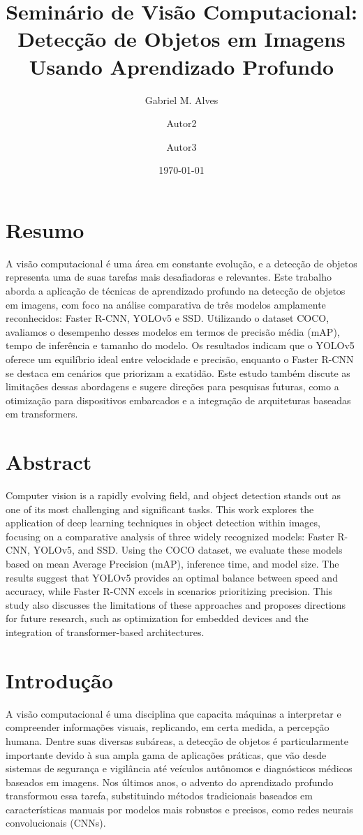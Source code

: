 \documentclass[a4paper,12pt]{article}
\title{Seminário de Visão Computacional: Detecção de Objetos em Imagens Usando Aprendizado Profundo}
\author{Gabriel M. Alves \and Autor2 \and Autor3}
\date{\today}
\begin{document}
	
	\maketitle
	
	\section*{Resumo}
	A visão computacional é uma área em constante evolução, e a detecção de objetos representa uma de suas tarefas mais desafiadoras e relevantes. Este trabalho aborda a aplicação de técnicas de aprendizado profundo na detecção de objetos em imagens, com foco na análise comparativa de três modelos amplamente reconhecidos: Faster R-CNN, YOLOv5 e SSD. Utilizando o dataset COCO, avaliamos o desempenho desses modelos em termos de precisão média (mAP), tempo de inferência e tamanho do modelo. Os resultados indicam que o YOLOv5 oferece um equilíbrio ideal entre velocidade e precisão, enquanto o Faster R-CNN se destaca em cenários que priorizam a exatidão. Este estudo também discute as limitações dessas abordagens e sugere direções para pesquisas futuras, como a otimização para dispositivos embarcados e a integração de arquiteturas baseadas em transformers.
	
	\section*{Abstract}
	Computer vision is a rapidly evolving field, and object detection stands out as one of its most challenging and significant tasks. This work explores the application of deep learning techniques in object detection within images, focusing on a comparative analysis of three widely recognized models: Faster R-CNN, YOLOv5, and SSD. Using the COCO dataset, we evaluate these models based on mean Average Precision (mAP), inference time, and model size. The results suggest that YOLOv5 provides an optimal balance between speed and accuracy, while Faster R-CNN excels in scenarios prioritizing precision. This study also discusses the limitations of these approaches and proposes directions for future research, such as optimization for embedded devices and the integration of transformer-based architectures.
	
	\section{Introdução}
	A visão computacional é uma disciplina que capacita máquinas a interpretar e compreender informações visuais, replicando, em certa medida, a percepção humana. Dentre suas diversas subáreas, a detecção de objetos é particularmente importante devido à sua ampla gama de aplicações práticas, que vão desde sistemas de segurança e vigilância até veículos autônomos e diagnósticos médicos baseados em imagens. Nos últimos anos, o advento do aprendizado profundo transformou essa tarefa, substituindo métodos tradicionais baseados em características manuais por modelos mais robustos e precisos, como redes neurais convolucionais (CNNs).
	
\end{document}
